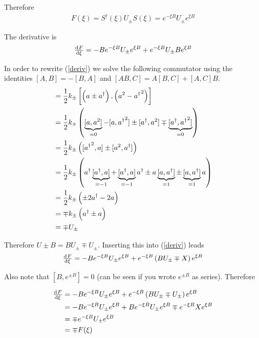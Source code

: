 \documentclass[a4paper,german,12pt,smallheadings]{scrartcl}
\begin{document}
\begin{enumerate}[a)]
    Therefore
    \begin{align*}
      F(\xi) = S^\dagger(\xi) U_\pm S(\xi) = e^{-\xi B} U_\pm e^{\xi B}
    \end{align*}

    The derivative is
    \begin{equation}
      \od{F}{\xi} = -Be^{-\xi B}U_\pm e^{\xi B} + e^{-\xi B}U_\pm B e^{\xi B}
      \label{deriv}
    \end{equation}

    In order to rewrite (\ref{deriv}) we solve the following commutator using
    the identities $[A,B] = -[B,A]$ and $[AB,C] = A[B,C] + [A,C]B$.
    \begin{align*}
      [U_\pm,B] &= \frac{1}{2} k_\pm \left[\del{a \pm a^\dagger}, \del{a^2 - {a^\dagger}^2}\right] \\
            &= \frac{1}{2} k_\pm \del{\underbrace{[a,a^2]}_{=0} - [a,{a^\dagger}^2] \pm [a^\dagger, a^2] \mp \underbrace{[a^\dagger, {a^\dagger}^2]}_{=0}} \\
            &= \frac{1}{2} k_\pm \del{[{a^\dagger}^2, a] \pm [a^2, a^\dagger]} \\
            &= \frac{1}{2} k_\pm \del{a^\dagger \underbrace{[a^\dagger,a] }_{=-1}+ \underbrace{[a^\dagger, a]}_{=-1}a^\dagger \pm a\underbrace{[a,a^\dagger]}_{=1} \pm \underbrace{[a,a^\dagger]}_{=1}a} \\
            &= \frac{1}{2} k_\pm \del{\pm2a^\dagger -2a} \\
            &= \mp k_\pm \del{a^\dagger \pm a} \\
            &= \mp U_\pm
    \end{align*}

    Therefore $U\pm B = BU_\pm \mp U_\pm$. Inserting this into (\ref{deriv}) leads
    \begin{equation}
      \od{F}{\xi} = -Be^{-\xi B}U_\pm e^{\xi B} + e^{-\xi B} \del{B U_\pm \mp X} e^{\xi B}
    \end{equation}

    Also note that $[B,e^{\pm B}] = 0$ (can be seen if you wrote $e^{\pm B}$ as series). Therefore

    \begin{align*}
      \od{F}{\xi} &= -B e^{-\xi B}U_\pm e^{\xi B} + e^{-\xi B} \del{BU_\pm \mp U_\pm} e^{\xi B} \\
                  &= -B e^{-\xi B}U_\pm e^{\xi B} + B e^{-\xi B} U_\pm e^{\xi B} \mp e^{-\xi B}Xe^{\xi B} \\
                  &= \mp e^{-\xi B}U_\pm e^{\xi B} \\
                  &= \mp F(\xi)
    \end{align*}


\end{enumerate}
\end{document}
